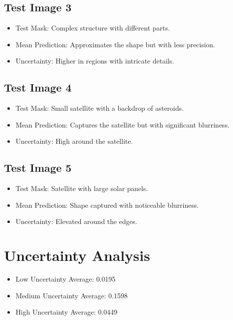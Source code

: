 \documentclass{article}
\begin{document}
\subsection{Test Image 3}
\begin{itemize}
    \item Test Mask: Complex structure with different parts.
    \item Mean Prediction: Approximates the shape but with less precision.
    \item Uncertainty: Higher in regions with intricate details.
\end{itemize}

\subsection{Test Image 4}
\begin{itemize}
    \item Test Mask: Small satellite with a backdrop of asteroids.
    \item Mean Prediction: Captures the satellite but with significant blurriness.
    \item Uncertainty: High around the satellite.
\end{itemize}


\subsection{Test Image 5}
\begin{itemize}
    \item Test Mask: Satellite with large solar panels.
    \item Mean Prediction: Shape captured with noticeable blurriness.
    \item Uncertainty: Elevated around the edges.
\end{itemize}


\section{Uncertainty Analysis}
\begin{itemize}
    \item Low Uncertainty Average: 0.0195
    \item Medium Uncertainty Average: 0.1598
    \item High Uncertainty Average: 0.0449
\end{itemize}
\end{document}
